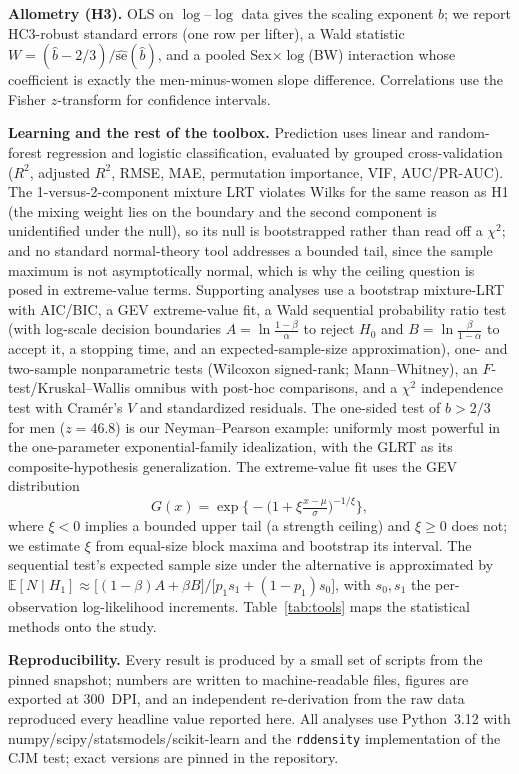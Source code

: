 \documentclass[conference]{IEEEtran}
\begin{document}
\textbf{Allometry (H3).} OLS on $\log$--$\log$ data gives the scaling exponent
$b$; we report HC3-robust standard errors (one row per lifter), a Wald statistic
$W=(\hat b-2/3)/\widehat{\mathrm{se}}(\hat b)$, and a pooled
Sex$\times\log$(BW) interaction whose coefficient is exactly the men-minus-women
slope difference. Correlations use the Fisher $z$-transform for confidence
intervals.

\textbf{Learning and the rest of the toolbox.} Prediction uses linear and
random-forest regression and logistic classification, evaluated by grouped
cross-validation ($R^2$, adjusted $R^2$, RMSE, MAE, permutation importance, VIF,
AUC/PR-AUC). The 1-versus-2-component mixture LRT violates Wilks for the same
reason as H1 (the mixing weight lies on the boundary and the second component is
unidentified under the null), so its null is bootstrapped rather than read off a
$\chi^2$; and no standard normal-theory tool addresses a bounded tail, since the sample maximum is
not asymptotically normal, which is why the ceiling question is posed in
extreme-value terms. Supporting analyses use a bootstrap mixture-LRT with AIC/BIC, a GEV
extreme-value fit, a Wald sequential probability ratio test (with log-scale decision
boundaries $A=\ln\frac{1-\beta}{\alpha}$ to reject $H_0$ and
$B=\ln\frac{\beta}{1-\alpha}$ to accept it, a stopping
time, and an expected-sample-size approximation), one- and two-sample nonparametric
tests (Wilcoxon signed-rank; Mann--Whitney), an $F$-test/Kruskal--Wallis omnibus
with post-hoc comparisons, and a $\chi^2$ independence test with Cram\'er's $V$ and
standardized residuals. The one-sided test of $b>2/3$ for men ($z=46.8$) is our
Neyman--Pearson example: uniformly most powerful in the one-parameter
exponential-family idealization, with the GLRT as its composite-hypothesis
generalization. The extreme-value fit uses the GEV distribution
\begin{equation}
G(x)=\exp\!\Big\{-\big(1+\xi\tfrac{x-\mu}{\sigma}\big)^{-1/\xi}\Big\},
\end{equation}
where $\xi<0$ implies a bounded upper tail (a strength ceiling) and $\xi\ge0$ does
not; we estimate $\xi$ from equal-size block maxima and bootstrap its interval. The
sequential test's expected sample size under the alternative is approximated by
$\mathbb{E}[N\mid H_1]\approx\big[(1-\beta)A+\beta B\big]/\big[p_1 s_1+(1-p_1)s_0\big]$,
with $s_0,s_1$ the per-observation log-likelihood increments.
Table~\ref{tab:tools} maps the statistical methods onto the study.

\textbf{Reproducibility.} Every result is produced by a small set of scripts from
the pinned snapshot; numbers are written to machine-readable files, figures are
exported at 300~DPI, and an independent re-derivation from the raw data reproduced
every headline value reported here. All analyses use Python~3.12 with
numpy/scipy/statsmodels/scikit-learn and the \texttt{rddensity} implementation of
the CJM test; exact versions are pinned in the repository.
\end{document}
